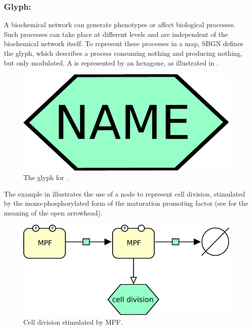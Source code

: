 \subsubsection{Glyph: }
\label{sec:phenotype}

A biochemical network can generate phenotypes or affect biological
processes.  Such processes can take place at different levels and are
independent of the biochemical network itself.  To represent these
processes in a map, SBGN defines the  glyph, which describes a process consuming nothing and producing nothing, but only modulated. A  is represented by an hexagone, as illustrated in . 

\begin{figure}[htb]
  \centering
  \includegraphics[scale = 0.3]{le_images/phenotype}
  \caption{The \PD glyph for .}
  \label{fig:phenotype}
\end{figure}

The example in  illustrates the use of a  node to represent cell division, stimulated by the mono-phosphorylated form of the maturation promoting factor (see  for the meaning of the open arrowhead). 

\begin{figure}[htb]
  \centering
  \includegraphics[scale = 0.5]{le_images/phenotype-MPF}
  \caption{Cell division stimulated by MPF.}
  \label{fig:phenotype-MPF}
\end{figure}


